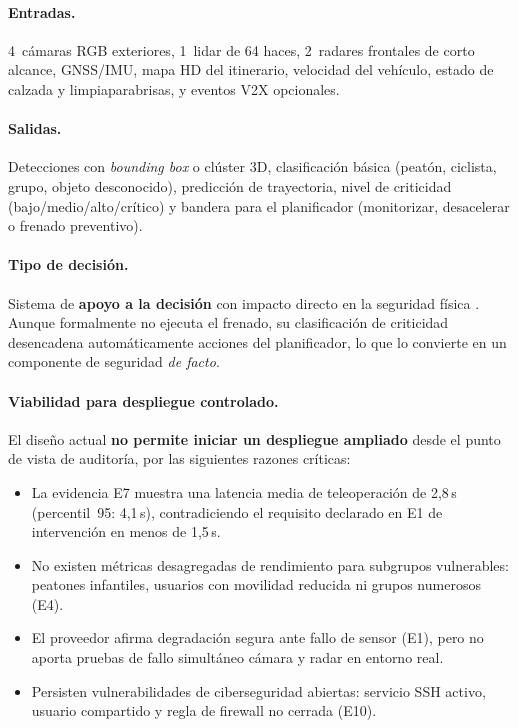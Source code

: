 \documentclass[11pt]{article}
\begin{document}
\paragraph{Entradas.} 4~cámaras RGB exteriores, 1~lidar de 64 haces, 2~radares frontales de corto alcance, GNSS/IMU, mapa HD del itinerario, velocidad del vehículo, estado de calzada y limpiaparabrisas, y eventos V2X opcionales.

\paragraph{Salidas.} Detecciones con \textit{bounding box} o clúster 3D, clasificación básica (peatón, ciclista, grupo, objeto desconocido), predicción de trayectoria, nivel de criticidad (bajo/medio/alto/crítico) y bandera para el planificador (monitorizar, desacelerar o frenado preventivo).

\paragraph{Tipo de decisión.} Sistema de \textbf{apoyo a la decisión} con impacto directo en la seguridad física \parencite{amodei2016concrete}. Aunque formalmente no ejecuta el frenado, su clasificación de criticidad desencadena automáticamente acciones del planificador, lo que lo convierte en un componente de seguridad \textit{de facto}.

\paragraph{Viabilidad para despliegue controlado.} El diseño actual \textbf{no permite iniciar un despliegue ampliado} desde el punto de vista de auditoría, por las siguientes razones críticas:
\begin{itemize}[nosep]
    \item La evidencia E7 muestra una latencia media de teleoperación de 2,8\,s (percentil~95: 4,1\,s), contradiciendo el requisito declarado en E1 de intervención en menos de 1,5\,s.
    \item No existen métricas desagregadas de rendimiento para subgrupos vulnerables: peatones infantiles, usuarios con movilidad reducida ni grupos numerosos (E4).
    \item El proveedor afirma degradación segura ante fallo de sensor (E1), pero no aporta pruebas de fallo simultáneo cámara y radar en entorno real.
    \item Persisten vulnerabilidades de ciberseguridad abiertas: servicio SSH activo, usuario compartido y regla de firewall no cerrada (E10).
\end{itemize}
\end{document}
